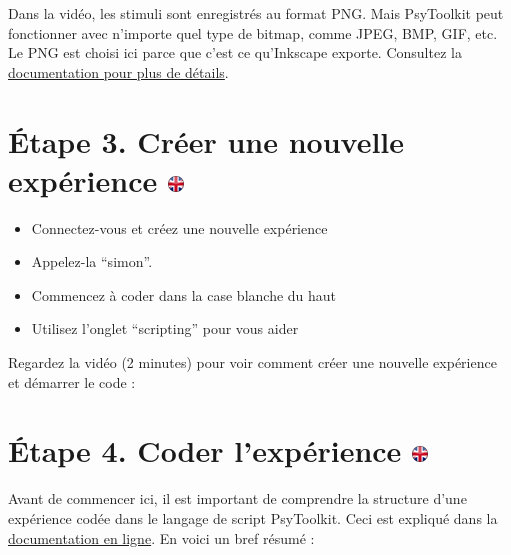 \documentclass[
]{book}
\providecommand{\tightlist}{%
  \setlength{\itemsep}{0pt}\setlength{\parskip}{0pt}}
\begin{document}
Dans la vidéo, les stimuli sont enregistrés au format PNG. Mais
PsyToolkit peut fonctionner avec n'importe quel type de bitmap, comme
JPEG, BMP, GIF, etc. Le PNG est choisi ici parce que c'est ce
qu'Inkscape exporte. Consultez la \protect\hyperlink{s4-2}{documentation
pour plus de détails}.

\hypertarget{uxe9tape-3.-cruxe9er-une-nouvelle-expuxe9rience}{%
\section[Étape 3. Créer une nouvelle expérience ]{\texorpdfstring{Étape
3. Créer une nouvelle expérience
\href{https://www.psytoolkit.org/lessons/project.html\#_step_3_create_new_experiment}{\protect\includegraphics{img/ukflag.png}}}{Étape 3. Créer une nouvelle expérience }}\label{uxe9tape-3.-cruxe9er-une-nouvelle-expuxe9rience}}

\begin{itemize}
\tightlist
\item
  Connectez-vous et créez une nouvelle expérience
\item
  Appelez-la ``simon''.
\item
  Commencez à coder dans la case blanche du haut
\item
  Utilisez l'onglet ``scripting'' pour vous aider
\end{itemize}

Regardez la vidéo (2 minutes) pour voir comment créer une nouvelle
expérience et démarrer le code :

\hypertarget{uxe9tape-4.-coder-lexpuxe9rience}{%
\section[Étape 4. Coder l'expérience ]{\texorpdfstring{Étape 4. Coder
l'expérience
\href{https://www.psytoolkit.org/lessons/project.html\#_step_4_create_new_experiment}{\protect\includegraphics{img/ukflag.png}}}{Étape 4. Coder l'expérience }}\label{uxe9tape-4.-coder-lexpuxe9rience}}

Avant de commencer ici, il est important de comprendre la structure
d'une expérience codée dans le langage de script PsyToolkit. Ceci est
expliqué dans la \protect\hyperlink{structure_of_scripts}{documentation
en ligne}. En voici un bref résumé :
\end{document}
